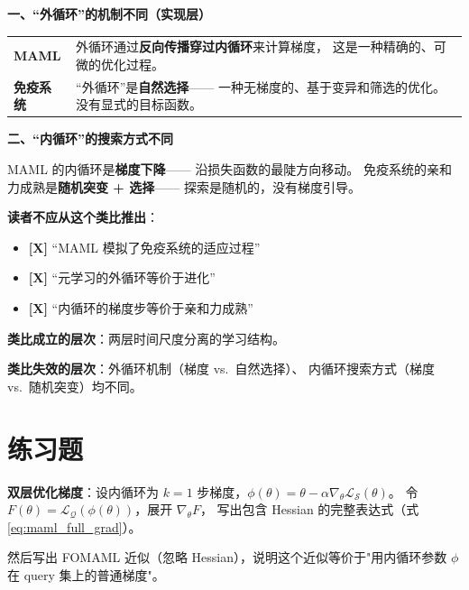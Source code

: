 \begin{analogyboundarybox}[title=这个类比在哪里失效]

\textbf{一、``外循环''的机制不同（实现层）}

\begin{tabular}{p{5cm} p{8cm}}
\textbf{MAML}
& 外循环通过\textbf{反向传播穿过内循环}来计算梯度，
  这是一种精确的、可微的优化过程。 \\
\textbf{免疫系统}
& ``外循环''是\textbf{自然选择}——
  一种无梯度的、基于变异和筛选的优化。
  没有显式的目标函数。 \\
\end{tabular}

\medskip\textbf{二、``内循环''的搜索方式不同}

MAML 的内循环是\textbf{梯度下降}——
沿损失函数的最陡方向移动。
免疫系统的亲和力成熟是\textbf{随机突变 + 选择}——
探索是随机的，没有梯度引导。

\medskip\textbf{读者不应从这个类比推出}：
\begin{itemize}
  \item \textbf{[X]} ``MAML 模拟了免疫系统的适应过程''
  \item \textbf{[X]} ``元学习的外循环等价于进化''
  \item \textbf{[X]} ``内循环的梯度步等价于亲和力成熟''
\end{itemize}

\medskip
\textbf{类比成立的层次}：两层时间尺度分离的学习结构。

\textbf{类比失效的层次}：外循环机制（梯度 vs.\ 自然选择）、
内循环搜索方式（梯度 vs.\ 随机突变）均不同。

\end{analogyboundarybox}

\section{练习题}
\label{sec:bilevel_exercises}

\begin{exercise}
\textbf{双层优化梯度}：设内循环为 $k=1$ 步梯度，$\phi(\theta) = \theta - \alpha \nabla_\theta \mathcal{L}_\mathcal{S}(\theta)$。
令 $F(\theta) = \mathcal{L}_\mathcal{Q}(\phi(\theta))$，展开 $\nabla_\theta F$，
写出包含 Hessian 的完整表达式（式 \eqref{eq:maml_full_grad}）。

然后写出 FOMAML 近似（忽略 Hessian），说明这个近似等价于"用内循环参数 $\phi$ 在 query 集上的普通梯度"。
\end{exercise}

